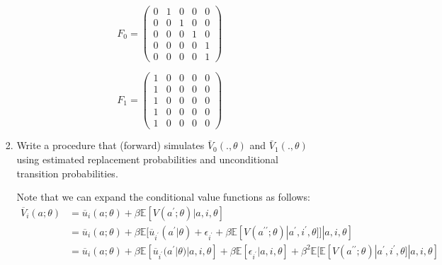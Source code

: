 \documentclass{article}
\begin{document}
\begin{enumerate}
\begin{enumerate}
\begin{enumerate}
\begin{answer}
$$F_0 = 
\begin{pmatrix}
0 & 1 & 0 & 0 & 0 \\
0 & 0 & 1 & 0 & 0 \\ 
0 & 0 & 0 & 1 & 0 \\ 
0 & 0 & 0 & 0 & 1 \\ 
0 & 0 & 0 & 0 & 1
\end{pmatrix}
$$

$$F_1 = 
\begin{pmatrix}
1 & 0 & 0 & 0 & 0 \\
1 & 0 & 0 & 0 & 0 \\ 
1 & 0 & 0 & 0 & 0 \\ 
1 & 0 & 0 & 0 & 0 \\ 
1 & 0 & 0 & 0 & 0
\end{pmatrix}
$$
\end{answer}





    \item Write a procedure that (forward) simulates $\bar{V}_0(.,\theta)$ and $\bar{V}_1(.,\theta)$ using estimated replacement probabilities and unconditional transition probabilities.

    \begin{answer}
    Note that we can expand the conditional value functions as follows: 
    \begin{align*}
    \overline{V}_i(a; \theta) & = \overline{u}_i(a;\theta) +  \beta \mathbb{E} [V(a^{\prime};\theta) |a,i,\theta] \\
    &=\overline{u}_i(a;\theta)+\beta \mathbb{E} [ \overline{u}_{i^\prime}(a^\prime|\theta) + \epsilon_{i^\prime} +\beta \mathbb{E}[V(a^{\prime \prime};\theta)|a^\prime , i^\prime, \theta]]   |a,i,\theta] \\& = 
    \overline{u}_i(a;\theta)+\beta \mathbb{E} [ \overline{u}_{i^\prime}(a^\prime|\theta)|a,i,\theta] + \beta \mathbb{E}[\epsilon_{i^\prime}|a,i,\theta] +\beta^2  \mathbb{E} [\mathbb{E}[V(a^{\prime \prime};\theta)|a^\prime , i^\prime, \theta]   |a,i,\theta] \end{align*}


\end{answer}
\end{enumerate}
\end{enumerate}
\end{enumerate}
\end{document}
